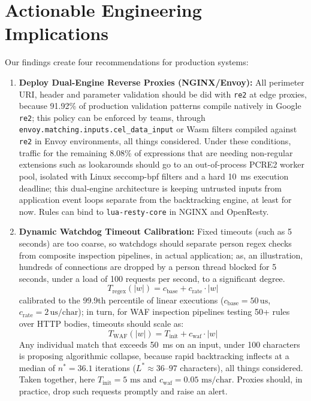 \documentclass{ieeeaccess}
\begin{document}
\section{Actionable Engineering Implications}
Our findings create four recommendations for production systems:
\begin{enumerate}
    \item \textbf{Deploy Dual-Engine Reverse Proxies (NGINX/Envoy):} All perimeter URI, header and parameter validation should be did with \texttt{re2} at edge proxies, because 91.92\% of production validation patterns compile natively in Google \texttt{re2}; this policy can be enforced by teams, through \texttt{envoy.matching.inputs.cel\_data\_input} or Wasm filters compiled against \texttt{re2} in Envoy environments, all things considered. Under these conditions, traffic for the remaining 8.08\% of expressions that are needing non-regular extensions such as lookarounds should go to an out-of-process PCRE2 worker pool, isolated with Linux seccomp-bpf filters and a hard 10~ms execution deadline; this dual-engine architecture is keeping untrusted inputs from application event loops separate from the backtracking engine, at least for now. Rules can bind to \texttt{lua-resty-core} in NGINX and OpenResty.
    \item \textbf{Dynamic Watchdog Timeout Calibration:} Fixed timeouts (such as 5 seconds) are too coarse, so watchdogs should separate person regex checks from composite inspection pipelines, in actual application; as, an illustration, hundreds of connections are dropped by a person thread blocked for 5 seconds, under a load of 100 requests per second, to a significant degree.
    \begin{equation}\label{eq:timeout_regex}
    T_{\mathrm{regex}}(|w|) = c_{\mathrm{base}} + c_{\mathrm{rate}} \cdot |w|
    \end{equation}
    calibrated to the 99.9th percentile of linear executions ($c_{\mathrm{base}} = 50\,\text{us}$, $c_{\mathrm{rate}} = 2\,\text{us/char}$); in turn, for WAF inspection pipelines testing 50+ rules over HTTP bodies, timeouts should scale as:
    \begin{equation}\label{eq:timeout_waf}
    T_{\mathrm{WAF}}(|w|) = T_{\mathrm{init}} + c_{\mathrm{waf}} \cdot |w|
    \end{equation}
    Any individual match that exceeds 50~ms on an input, under 100 characters is proposing algorithmic collapse, because rapid backtracking inflects at a median of $n^* = 36.1$ iterations ($L^* \approx 36$--$97$ characters), all things considered. Taken together, here $T_{\mathrm{init}} = 5\text{ ms}$ and $c_{\mathrm{waf}} = 0.05\text{ ms/char}$. Proxies should, in practice, drop such requests promptly and raise an alert.

\end{enumerate}
\end{document}
